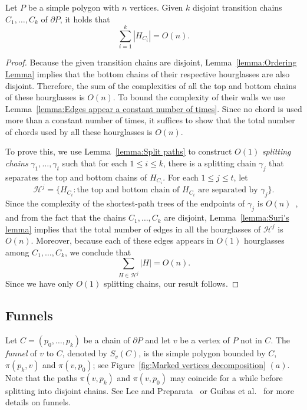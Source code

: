 \documentclass[a4paper,UKenglish]{lipics}
\newcommand{\fn}[2]{\ensuremath{S_{\scriptscriptstyle #1}(#2)}}
\newcommand{\p}[2]{\ensuremath{\pi(#1, #2)}}
\begin{document}
\begin{lemma}\label{lemma:Bounding complexity of hourglasses}
Let $P$ be a simple polygon with $n$ vertices.
Given $k$ disjoint transition chains $C_1, \ldots, C_k$  of $\partial P$, it holds that  $$\sum_{i=1}^k |H_{C_i}| = O(n).$$
\end{lemma}
\begin{proof}

Because the given transition chains are disjoint, Lemma~\ref{lemma:Ordering Lemma} implies that the bottom chains of their respective hourglasses are also disjoint. Therefore, the sum of the complexities of all the top and bottom chains of these hourglasses is $O(n)$. 
To bound the complexity of their walls we use
Lemma~\ref{lemma:Edges appear a constant number of times}. Since  no chord is used more than a constant number of times, it suffices to show that the total number of chords used by all these hourglasses is $O(n)$.

To prove this, we use Lemma~\ref{lemma:Split paths} to construct $O(1)$ \emph{splitting chains} $\gamma_1, \ldots, \gamma_t$ such that for each $1\leq i\leq k$, there is a splitting chain $\gamma_j$ that separates the top and bottom chains of $H_{C_i}$.
For each $1\leq j\leq t$, let $$\mathcal H^j = \{H_{C_i} : \text{the top and bottom chain of $H_{C_i}$ are separated by }\gamma_j\}.$$
Since the complexity of the shortest-path trees of the endpoints of $\gamma_j$ is $O(n)$~\cite{guibasShortestPathTree},
and from the fact that the chains $C_1, \ldots, C_k$ are disjoint,  Lemma~\ref{lemma:Suri's lemma} implies that
the total number of edges in all the hourglasses of $\mathcal H^j$ is $O(n)$. Moreover, because each of these edges appears in $O(1)$ hourglasses among $C_1, \ldots, C_k$, we conclude that 
$$\sum_{H \in \mathcal H^j } |H| = O(n).$$
Since we have only $O(1)$ splitting chains, our result follows.
\end{proof}

\subsection{Funnels}

Let $C = (p_0, \ldots, p_k)$ be a chain of $\partial P$ and let $v$ be a vertex of $P$ not in $C$.
The \emph{funnel} of $v$ to $C$, denoted by $\fn{v}{C}$, is the simple polygon bounded by $C$, $\p{p_k}{v}$ and $\p{v}{p_0}$; see Figure~\ref{fig:Marked vertices decomposition} $(a)$. 
Note that the paths $\p{v}{p_k}$ and $\p{v}{p_0}$ may coincide for a while before splitting into disjoint chains. 
See Lee and Preparata~\cite{lee1984euclidean} or Guibas et al.~\cite{guibasShortestPathTree} for more details on funnels.
\end{document}
